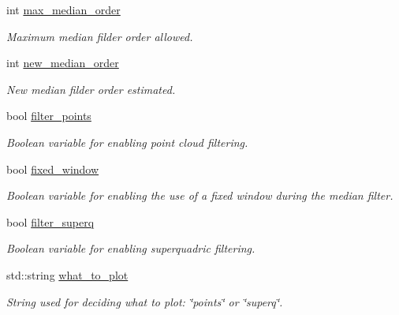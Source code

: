 \begin{DoxyCompactItemize}
\mbox{\label{classSuperqModule_a1d1b6f621d446969d9a8aa9abfafa7f9}} 
int \mbox{\hyperlink{classSuperqModule_a1d1b6f621d446969d9a8aa9abfafa7f9}{max\+\_\+median\+\_\+order}}
\begin{DoxyCompactList}\small\item\em Maximum median filder order allowed. \end{DoxyCompactList}\item 
\mbox{\label{classSuperqModule_a1409f49f4c5824ec604ce214654d3e22}} 
int \mbox{\hyperlink{classSuperqModule_a1409f49f4c5824ec604ce214654d3e22}{new\+\_\+median\+\_\+order}}
\begin{DoxyCompactList}\small\item\em New median filder order estimated. \end{DoxyCompactList}\item 
\mbox{\label{classSuperqModule_aa1bc1b1b7d3ef1b287d0c8d15d9a51bc}} 
bool \mbox{\hyperlink{classSuperqModule_aa1bc1b1b7d3ef1b287d0c8d15d9a51bc}{filter\+\_\+points}}
\begin{DoxyCompactList}\small\item\em Boolean variable for enabling point cloud filtering. \end{DoxyCompactList}\item 
\mbox{\label{classSuperqModule_a07ff8af914d2f3b5ae9fbc03b94954e7}} 
bool \mbox{\hyperlink{classSuperqModule_a07ff8af914d2f3b5ae9fbc03b94954e7}{fixed\+\_\+window}}
\begin{DoxyCompactList}\small\item\em Boolean variable for enabling the use of a fixed window during the median filter. \end{DoxyCompactList}\item 
\mbox{\label{classSuperqModule_a3e824c0b36749d3e9d2ff755004b7472}} 
bool \mbox{\hyperlink{classSuperqModule_a3e824c0b36749d3e9d2ff755004b7472}{filter\+\_\+superq}}
\begin{DoxyCompactList}\small\item\em Boolean variable for enabling superquadric filtering. \end{DoxyCompactList}\item 
\mbox{\label{classSuperqModule_a1f1963d5a8947368cec96d4fbcc3ec79}} 
std\+::string \mbox{\hyperlink{classSuperqModule_a1f1963d5a8947368cec96d4fbcc3ec79}{what\+\_\+to\+\_\+plot}}
\begin{DoxyCompactList}\small\item\em String used for deciding what to plot\+: \char`\"{}points\char`\"{} or \char`\"{}superq\char`\"{}. \end{DoxyCompactList}\item 

\end{DoxyCompactItemize}
